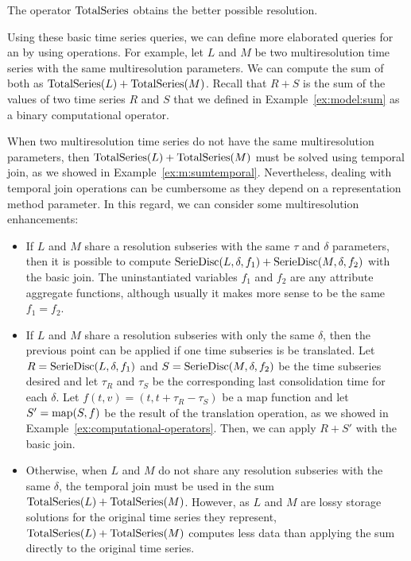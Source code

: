The operator $\operatorname{TotalSeries}$ obtains the better possible resolution.

Using these basic time series queries, we can define more elaborated
queries for an  by using  operations. For
example, let $L$ and $M$ be two multiresolution time series with the
same multiresolution parameters. We can compute the sum of both as
$\operatorname{TotalSeries}(L) + \operatorname{TotalSeries}(M)$. Recall that $R+S$ is the sum of
the values of two time series $R$ and $S$ that we defined in
Example~\ref{ex:model:sum} as a binary computational operator.


When two multiresolution time series do not have the same
multiresolution parameters, then $\operatorname{TotalSeries}(L) + \operatorname{TotalSeries}(M)$
must be solved using temporal join, as we showed in
Example~\ref{ex:m:sumtemporal}. Nevertheless, dealing with
temporal join operations can be cumbersome as they depend on a
representation method parameter. In this regard, we can consider some
multiresolution enhancements:

\begin{itemize}

\item If $L$ and $M$ share a resolution subseries with the same
  $\tau$ and $\delta$ parameters, then it is possible to compute
  $\operatorname{SerieDisc}(L,\delta,f_1) + \operatorname{SerieDisc}(M,\delta,f_2)$ with the basic
  join. The uninstantiated variables $f_1$ and $f_2$ are any attribute
  aggregate functions, although usually it makes more sense to be the
  same $f_1=f_2$.

\item If $L$ and $M$ share a resolution subseries with only the same
  $\delta$, then the previous point can be applied if one time
  subseries is be translated. Let $R=\operatorname{SerieDisc}(L,\delta,f_1)$ and
  $S=\operatorname{SerieDisc}(M,\delta,f_2)$ be the time subseries desired and let
  $\tau_R$ and $\tau_S$ be the corresponding last consolidation time
  for each $\delta$. Let $f(t,v)=(t,t+\tau_R-\tau_S)$ be a map
  function and let $S'=\operatorname*{map}(S,f)$ be the result of the translation
  operation, as we showed in Example~\ref{ex:computational-operators}.
  Then, we can apply $R+S'$ with the basic join.
  
\item Otherwise, when $L$ and $M$ do not share any resolution
  subseries with the same $\delta$, the temporal join must be used in
  the sum $\operatorname{TotalSeries}(L) + \operatorname{TotalSeries}(M)$.  However, as $L$ and
  $M$ are lossy storage solutions for the original time series they
  represent, $\operatorname{TotalSeries}(L) + \operatorname{TotalSeries}(M)$ computes less data
  than applying the sum directly to the original time series.

\end{itemize}




